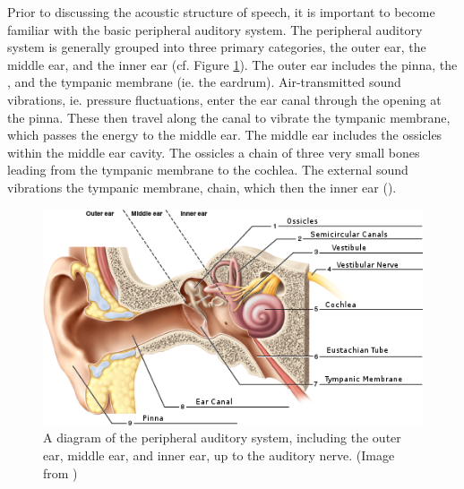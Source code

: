 Prior to discussing the acoustic structure of speech, it is important to become familiar with the basic peripheral auditory system.  The peripheral auditory system is generally grouped into three primary categories, the outer ear, the middle ear, and the inner ear (cf. Figure \ref{fig:ear-anatomy}).  The outer ear includes the pinna, the \DIFdelbegin {}\DIFdelend \DIFaddbegin {}\DIFaddend , and the tympanic membrane (ie. the eardrum).  Air-transmitted sound vibrations, ie. pressure fluctuations, enter the ear canal through the opening at the pinna.  These then travel along the canal to vibrate the tympanic membrane, which passes the energy to the middle ear.  The middle ear includes the ossicles within the middle ear cavity.  The ossicles \DIFdelbegin {}\DIFdelend \DIFaddbegin {}\DIFaddend a chain of three very small bones leading from the tympanic membrane to the cochlea. The external sound vibrations \DIFdelbegin {}\DIFdelend \DIFaddbegin {}\DIFaddend the tympanic membrane, \DIFdelbegin {}\DIFdelend \DIFaddbegin {}\DIFaddend chain, which then \DIFdelbegin {}\DIFdelend \DIFaddbegin {}\DIFaddend the inner ear (\cite{rosen:91}).

\begin{figure}[h]
\centering
  \includegraphics{figure/ear_anatomy.png}
  \caption{A diagram of the peripheral auditory system, including the outer ear, middle ear, and inner ear, up to the auditory nerve. (Image from \cite{martin:12})}
  \label{fig:ear-anatomy}
\end{figure}

